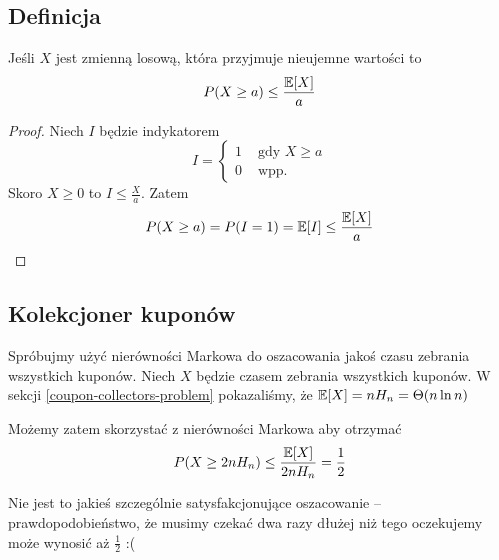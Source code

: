 \subsection{Definicja}
\begin{theorem}
	Jeśli \( X \) jest zmienną losową, która przyjmuje nieujemne wartości to
	\[
		P(X \geq a) \leq \frac{\expected{X}}{a}
	\]
\end{theorem}
\begin{proof}
	Niech \( I \) będzie indykatorem
	\[
		I = \begin{cases}
			1 & \text{ gdy } X \geq a \\
			0 & \text{ wpp. }
		\end{cases}
	\]
	Skoro \( X \geq 0 \) to \( I \leq \frac{X}{a} \).
	Zatem
	\[
		P(X \geq a) = P(I = 1) = \expected{I} \leq \frac{\expected{X}}{a}
	\]
\end{proof}

\subsection{Kolekcjoner kuponów}
Spróbujmy użyć nierówności Markowa do oszacowania jakoś czasu zebrania wszystkich kuponów.
Niech \( X \) będzie czasem zebrania wszystkich kuponów.
W sekcji \ref{coupon-collectors-problem} pokazaliśmy, że \( \expected{X} = nH_n = \Theta(n \ln n) \)

Możemy zatem skorzystać z nierówności Markowa aby otrzymać
\[
	P(X \geq 2n H_n) \leq \frac{\expected{X}}{2n H_n} = \frac{1}{2}
\]

Nie jest to jakieś szczególnie satysfakcjonujące oszacowanie -- prawdopodobieństwo, że musimy czekać dwa
razy dłużej niż tego oczekujemy może wynosić aż \( \frac{1}{2} \) :(
